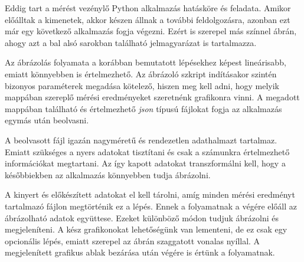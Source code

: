 Eddig tart a mérést vezénylő Python alkalmazás hatásköre és feladata.
Amikor előálltak a kimenetek, akkor készen állnak a további feldolgozásra, azonban ezt már egy következő alkalmazás fogja végezni.
Ezért is szerepel más színnel  ábrán, ahogy azt a bal alsó sarokban található jelmagyarázat is tartalmazza.

Az ábrázolás folyamata a korábban bemutatott lépésekhez képest lineárisabb, emiatt könnyebben is értelmezhető.
Az ábrázoló szkript indításakor szintén bizonyos paraméterek megadása kötelező, hiszen meg kell adni, hogy melyik mappában szereplő mérési eredményeket szeretnénk grafikonra vinni.
A megadott mappában található és értelmezhető \textit{json} típusú fájlokat fogja az alkalmazás egymás után beolvasni.

A beolvasott fájl igazán nagyméretű és rendezetlen adathalmazt tartalmaz.
Emiatt szükséges a nyers adatokat tisztítani és csak a számunkra értelmezhető információkat megtartani.
Az így kapott adatokat transzformálni kell, hogy a későbbiekben az alkalmazás könnyebben tudja ábrázolni.

A kinyert és előkészített adatokat el kell tárolni, amíg minden mérési eredményt tartalmazó fájlon megtörténik ez a lépés. 
Ennek a folyamatnak a végére előáll az ábrázolható adatok együttese.
Ezeket különböző módon tudjuk ábrázolni és megjeleníteni.
A kész grafikonokat lehetőségünk van lementeni, de ez csak egy opcionális lépés, emiatt szerepel az ábrán szaggatott vonalas nyíllal.
A megjelenített grafikus ablak bezárása után végére is értünk a folyamatnak.


